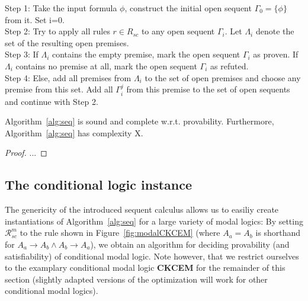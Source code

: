 \documentclass{entcs} \usepackage{entcsmacro}
\begin{document}
\begin{algorithm}[h]
\begin{alg}
  Step 1: Take the input formula $\phi$, construct the initial open
  sequent $\Gamma_0 = \{\phi\}$ from it. Set i=0.\\
  Step 2: Try to apply all rules $r\in R_{sc}$ to any open sequent
  $\Gamma_i$. Let $\Lambda_i$ denote the set of the resulting open
  premises.\\
  Step 3: If $\Lambda_i$ contains the empty premise, mark the open
  sequent $\Gamma_i$ as proven. If $\Lambda_i$ contains no premise at
  all, mark the open sequent $\Gamma_i$ as refuted.\\
  Step 4: Else, add all premises from $\Lambda_i$ to the set of open
  premises and choose any premise from this set. Add all $\Gamma^j_i$
  from this premise to the set of open sequents and continue with
  Step 2.
\label{alg:seq}
\end{alg}
\end{algorithm}

\begin{proposition}
Algorithm~\ref{alg:seq} is sound and complete w.r.t. provability. Furthermore,
Algorithm~\ref{alg:seq} has complexity X.
\end{proposition}

\begin{proof}
...
\end{proof}

\subsection{The conditional logic instance}

The genericity of the introduced sequent calculus allows us to easiliy
create instantiations of Algorithm~\ref{alg:seq} for a large variety
of modal logics:
By setting $\mathcal R^m_{sc}$ to the rule shown in Figure~\ref{fig:modalCKCEM}
(where $A_a = A_b$ is shorthand for $A_a\rightarrow A_b\wedge A_b\rightarrow A_a$), we
obtain an algorithm for deciding provability (and satisfiability) of
conditional modal logic. Note however, that we restrict ourselves to the
examplary conditional modal logic \textbf{CKCEM} for the remainder of this section
(slightly adapted versions of the optimization will work for other conditional modal logics).
\end{document}
